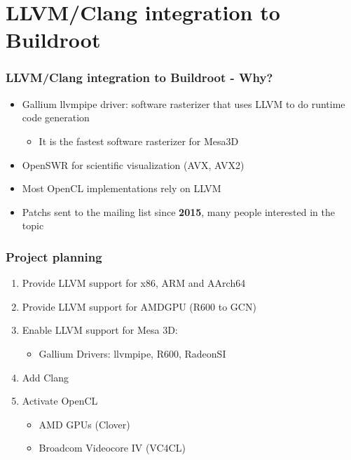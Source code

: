 \documentclass{smilebeamer}
\begin{document}
\section{LLVM/Clang integration to Buildroot}

\begin{frame}
\frametitle{LLVM/Clang integration to Buildroot - Why?}
\begin{itemize}
  \item Gallium llvmpipe driver: software rasterizer that uses LLVM to do runtime code generation
  \begin{itemize}
    \item It is the fastest software rasterizer for Mesa3D
  \end{itemize}
  \item OpenSWR for scientific visualization (AVX, AVX2)
  \item Most OpenCL implementations rely on LLVM
  \item Patchs sent to the mailing list since \textbf{2015}, many people interested in
  the topic
\end{itemize}
\end{frame}



\begin{frame}
\frametitle{Project planning}
\begin{enumerate}
  \item Provide LLVM support for x86, ARM and AArch64
  \item Provide LLVM support for AMDGPU (R600 to GCN)
  \item Enable LLVM support for Mesa 3D:
    \begin{itemize}
      \item Gallium Drivers: llvmpipe, R600, RadeonSI
    \end{itemize}
  \item Add Clang
  \item Activate OpenCL
  \begin{itemize}
    \item AMD GPUs (Clover)
    \item Broadcom Videocore IV (VC4CL)
  \end{itemize}
\end{enumerate}
\end{frame}
\end{document}

